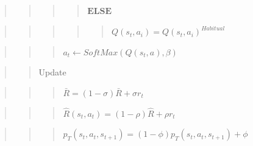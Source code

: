 \documentclass[10pt,a4paper,onecolumn]{article}
\begin{document}
\begin{quote}
\begin{quote}
\begin{quote}
\begin{quote}
\(\textbf{ELSE}\)
\end{quote}
\end{quote}
\end{quote}
\end{quote}

\begin{quote}
\begin{quote}
\begin{quote}
\begin{quote}
\begin{quote}
\(Q(s_t,a_i) = Q(s_t,a_i)^{Habitual}\)
\end{quote}
\end{quote}
\end{quote}
\end{quote}
\end{quote}

\begin{quote}
\begin{quote}
\begin{quote}
\(a_t \leftarrow \textit{SoftMax}(Q(s_t,a), \beta)\)
\end{quote}
\end{quote}
\end{quote}

\begin{quote}
\begin{quote}
Update
\end{quote}
\end{quote}

\begin{quote}
\begin{quote}
\begin{quote}
\(\bar{R} = (1-\sigma) \bar{R} + \sigma r_t\)
\end{quote}
\end{quote}
\end{quote}

\begin{quote}
\begin{quote}
\begin{quote}
\(\hat{R}(s_t,a_t) =(1 - \rho) \hat{R} + \rho r_t\)
\end{quote}
\end{quote}
\end{quote}

\begin{quote}
\begin{quote}
\begin{quote}
\(p_{T}(s_t, a_t, s_{t+1}) = (1 - \phi) p_{T}(s_t, a_t, s_{t+1}) + \phi\)
\end{quote}
\end{quote}
\end{quote}
\end{document}
